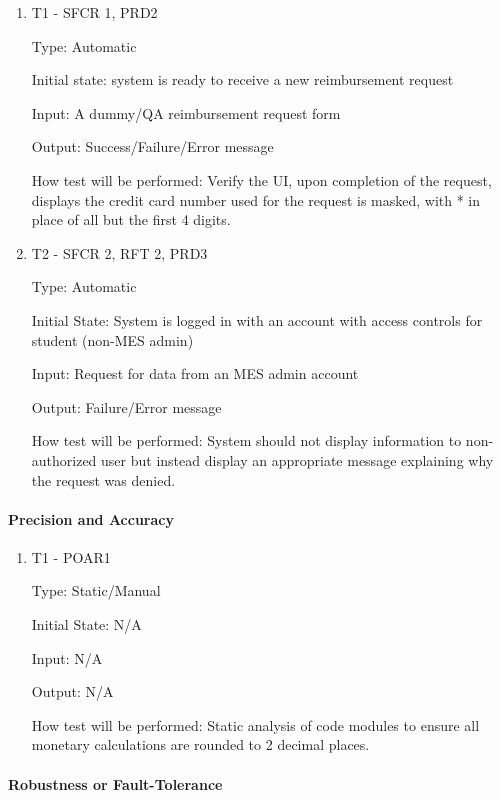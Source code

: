 \documentclass[12pt, titlepage]{article}
\begin{document}

\begin{enumerate}

\item{T1 - SFCR 1, PRD2\\}

Type: Automatic

Initial state: system is ready to receive a new reimbursement request

Input: A dummy/QA reimbursement request form

Output: Success/Failure/Error message

How test will be performed: Verify the UI, upon completion of the request, displays the credit card number used for the request is masked, with * in place of all but the first 4 digits.

\item{T2 - SFCR 2, RFT 2, PRD3\\}

Type: Automatic 

Initial State: System is logged in with an account with access controls for student (non-MES admin)

Input: Request for data from an MES admin account

Output: Failure/Error message

How test will be performed: System should not display information to non-authorized user but instead display an appropriate message explaining why the request was denied.
\end{enumerate}

\paragraph{Precision and Accuracy}

\begin{enumerate}
\item{T1 - POAR1\\}

Type: Static/Manual 

Initial State: N/A

Input: N/A

Output: N/A

How test will be performed: Static analysis of code modules to ensure all monetary calculations are rounded to 2 decimal places.
\end{enumerate}

\paragraph{Robustness or Fault-Tolerance}
\end{document}
